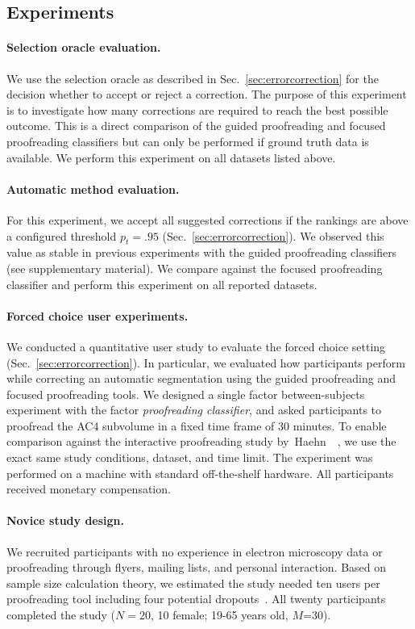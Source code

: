 \subsection{Experiments}

\paragraph{Selection oracle evaluation.} We use the selection oracle as described in Sec.~\ref{sec:errorcorrection} for the decision whether to accept or reject a correction. The purpose of this experiment is to investigate how many corrections are required to reach the best possible outcome. This is a direct comparison of the guided proofreading and focused proofreading classifiers but can only be performed if ground truth data is available. We perform this experiment on all datasets listed above.

\paragraph{Automatic method evaluation.} For this experiment, we accept all suggested corrections if the rankings are above a configured threshold $p_t=.95$ (Sec.~\ref{sec:errorcorrection}). We observed this value as stable in previous experiments with the guided proofreading classifiers (see supplementary material). We compare against the focused proofreading classifier and perform this experiment on all reported datasets.

\paragraph{Forced choice user experiments.} We conducted a quantitative user study to evaluate the forced choice setting (Sec.~\ref{sec:errorcorrection}). In particular, we evaluated how participants perform while correcting an automatic segmentation using the guided proofreading and focused proofreading tools. We designed a single factor between-subjects experiment with the factor \textit{proofreading classifier}, and asked participants to proofread the AC4 subvolume in a fixed time frame of 30 minutes. To enable comparison against the interactive proofreading study by~Haehn~\etal~\cite{haehn_dojo_2014}, we use the exact same study conditions, dataset, and time limit. The experiment was performed on a machine with standard off-the-shelf hardware. All participants received monetary compensation.

\paragraph{Novice study design.} We recruited participants with no experience in electron microscopy data or proofreading through flyers, mailing lists, and personal interaction. Based on sample size calculation theory, we estimated the study needed ten users per proofreading tool including four potential dropouts~\cite{samplesize1,samplesize2}. All twenty participants completed the study ($N=20$, 10 female; 19-65 years old, $M$=30). 


